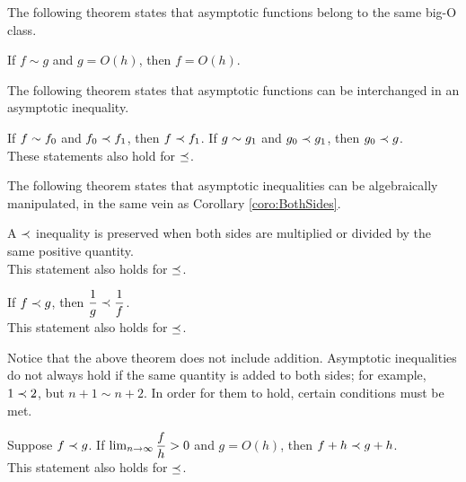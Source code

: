The following theorem states that asymptotic functions belong to the same big-O class.

\begin{theorem}
\label{thm:SameBigOClass}
	If $f \sim g$ and $g = O(h)$, then $f = O(h)$.
\end{theorem}

The following theorem states that asymptotic functions can be interchanged in an asymptotic inequality.

\begin{theorem}
\label{thm:InterchangeableInInequality}
	If $f \sim f_0$ and $f_0 \prec f_1$, then $f \prec f_1$. If $g \sim g_1$ and $g_0 \prec g_1$, then $g_0 \prec g$.\\
	These statements also hold for $\preceq$.
\end{theorem}

The following theorem states that asymptotic inequalities can be algebraically manipulated, in the same vein as Corollary \ref{coro:BothSides}.

\begin{theorem}
\label{thm:BothSidesInequality}
	A $\prec$ inequality is preserved when both sides are multiplied or divided by the same positive quantity.\\
	This statement also holds for $\preceq$.
\end{theorem}

\begin{corollary}
\label{coro:BothSidesInequalityInvert}
	If $f \prec g$, then $\dfrac{1}{g} \prec \dfrac{1}{f}$.\\
	This statement also holds for $\preceq$.
\end{corollary}

Notice that the above theorem does not include addition. Asymptotic inequalities do not always hold if the same quantity is added to both sides; for example, $1 \prec 2$, but $n + 1 \sim n + 2$. In order for them to hold, certain conditions must be met.

\begin{theorem}
\label{thm:BothSidesInequalityAdd}
	Suppose $f \prec g$. If $\lim_{n \to \infty} \dfrac{f}{h} > 0$ and $g = O(h)$, then $f + h \prec g + h$.\\
	This statement also holds for $\preceq$.
\end{theorem}